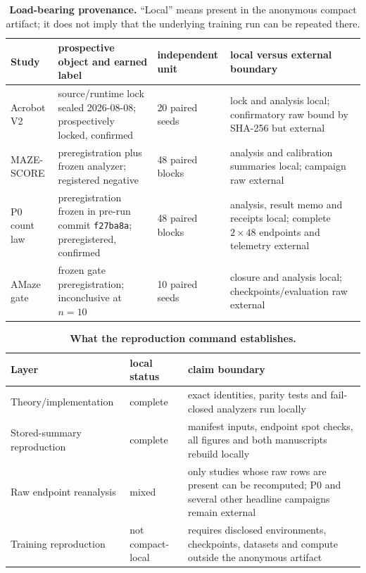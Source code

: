 \begin{table}[h]
\centering
\scriptsize
\setlength{\tabcolsep}{2.6pt}
\caption{\textbf{Load-bearing provenance.} ``Local'' means present in the
anonymous compact artifact; it does not imply that the underlying training
run can be repeated there.}
\label{tab:provenance}
\begin{tabular}{@{}p{.13\linewidth}p{.27\linewidth}p{.17\linewidth}p{.35\linewidth}@{}}
\toprule
Study & prospective object and earned label & independent unit & local versus external boundary \\
\midrule
Acrobot V2 & source/runtime lock sealed 2026-08-08; prospectively locked,
confirmed & 20 paired seeds & lock and analysis local; confirmatory raw bound
by SHA-256 but external \\
MAZE-SCORE & preregistration plus frozen analyzer; registered negative & 48
paired blocks & analysis and calibration summaries local; campaign raw external \\
P0 count law & preregistration frozen in pre-run commit \texttt{f27ba8a};
preregistered, confirmed & 48 paired blocks & analysis, result memo and
receipts local; complete $2\times48$ endpoints and telemetry external \\
AMaze gate & frozen gate preregistration; inconclusive at $n=10$ & 10 paired
seeds & closure and analysis local; checkpoints/evaluation raw external \\
\bottomrule
\end{tabular}
\end{table}

\begin{table}[h]
\centering
\scriptsize
\setlength{\tabcolsep}{2.8pt}
\caption{\textbf{What the reproduction command establishes.}}
\label{tab:reprolevels}
\begin{tabular}{@{}p{.23\linewidth}p{.25\linewidth}p{.45\linewidth}@{}}
\toprule
Layer & local status & claim boundary \\
\midrule
Theory/implementation & complete & exact identities, parity tests and
fail-closed analyzers run locally \\
Stored-summary reproduction & complete & manifest inputs, endpoint spot
checks, all figures and both manuscripts rebuild locally \\
Raw endpoint reanalysis & mixed & only studies whose raw rows are present can
be recomputed; P0 and several other headline campaigns remain external \\
Training reproduction & not compact-local & requires disclosed environments,
checkpoints, datasets and compute outside the anonymous artifact \\
\bottomrule
\end{tabular}
\end{table}

